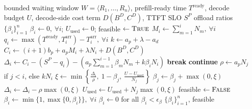 \begin{algorithm}[t]
\small
\caption{\instance: Budget-Aware Partial Prefill Offloading}
\label{alg:instance}
\begin{algorithmic}[1]
\Require bounded waiting window $W=\langle R_1,\dots,R_n\rangle$, prefill-ready time $T^{\mathrm{ready}}$, decode budget $U$, decode-side cost term $D(B^D,C^D)$, TTFT SLO $S^P$
\Ensure offload ratios $\{\beta_i\}_{i=1}^n$
\State $\beta_i \gets 0,\ \forall i$; $U_{\mathrm{used}} \gets 0$; feasible $\gets \textsc{True}$
\State $M_i \gets \sum_{m=1}^{i} N_m,\ \forall i$
\State $q_i \gets \max(T^{\mathrm{ready}}, T_i^{\mathrm{arr}}) - T_i^{\mathrm{arr}},\ \forall i$
\State $k \gets a_p + \lambda - a_d$
    \State $C_i \gets (i+1)b_p + a_pM_i + \lambda N_i + D(B^D,C^D)$
    \State $\Delta_i \gets C_i - (S^P - q_i) - \left(a_p\sum_{m=1}^{i-1}\beta_m N_m + k\beta_i N_i\right)$
            \State \textbf{break}
        \EndIf
            \State \textbf{continue}
        \EndIf
        \State $\rho \gets a_pN_j$ if $j<i$, else $kN_i$
        \State $\xi \gets \min\!\left\{\frac{\Delta_i}{\rho},\ 1-\beta_j,\ \frac{U-U_{\mathrm{used}}}{N_j}\right\}$
        \State $\beta_j \gets \beta_j + \max(0,\xi)$
        \State $\Delta_i \gets \Delta_i - \rho\max(0,\xi)$
        \State $U_{\mathrm{used}} \gets U_{\mathrm{used}} + N_j\max(0,\xi)$
    \EndFor
        \State feasible $\gets \textsc{False}$
    \EndIf
\EndFor
\State $\beta_i \gets \min\{1,\max\{0,\beta_i\}\},\ \forall i$
\State $\beta_i \gets 0$ for all $\beta_i < \epsilon_\beta$
\State \Return $\{\beta_i\}_{i=1}^n$, feasible
\end{algorithmic}
\end{algorithm}


\subsection{\cluster}
\label{subsec:cluster-level}

\clearpage

